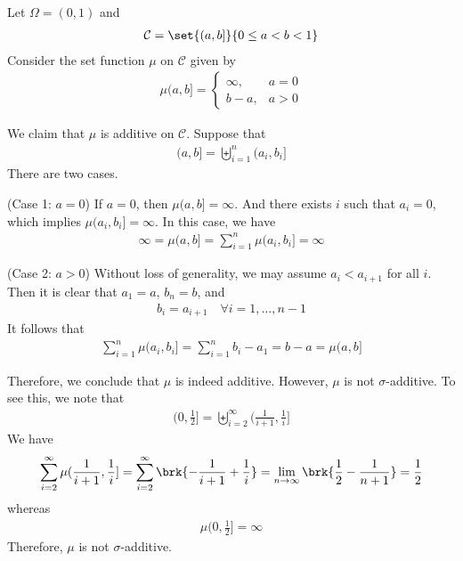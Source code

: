 \documentclass[thmcnt=section, 12pt, color=purple]{my-elegantbook}
\begin{document}
\begin{example} \label{eg:2}
	Let $\Omega = (0, 1)$ and
	\begin{align*}
		\mathcal{C} = \set{(a, b]}{0 \leq a < b < 1}
	\end{align*}
	Consider the set function $\mu$ on $\mathcal{C}$ given by
	\begin{align*}
		\mu (a, b] = \begin{cases}
			\infty,
			&a = 0 \\
			b - a,
			&a > 0
		\end{cases}
	\end{align*}
	
	We claim that $\mu$ is additive on $\mathcal{C}$.
	Suppose that
	\begin{align*}
		(a, b]
		= \biguplus_{i=1}^n (a_i, b_i]
	\end{align*}
	There are two cases.

	(Case 1: $a = 0$) If $a = 0$, then $\mu (a, b] = \infty$.
	And there exists $i$ such that $a_i = 0$,
	which implies $\mu(a_i, b_i] = \infty$.
	In this case, we have 
	\begin{align*}
		\infty = \mu (a, b]
		= \sum_{i=1}^n \mu(a_i, b_i] = \infty
	\end{align*}

	(Case 2: $a > 0$) Without loss of generality,
	we may assume $a_i < a_{i+1}$ for all $i$.
	Then it is clear that $a_1 = a$, $b_n = b$, and
	\begin{align*}
		b_i = a_{i+1}
		\quad \forall i = 1, \ldots, n-1
	\end{align*}
	It follows that 
	\begin{align*}
		\sum_{i=1}^n \mu (a_i, b_i]
		= \sum_{i=1}^n b_i - a_1
		= b - a 
		= \mu (a, b]
	\end{align*}

	Therefore, we conclude that $\mu$ is indeed additive.
	However, $\mu$ is not $\sigma$-additive.
	To see this, we note that 
	\begin{align*}
		(0, \frac{1}{2}]
		= \biguplus_{i = 2}^\infty ( \frac{1}{i+1}, \frac{1}{i} ]
	\end{align*}
	We have 
	\begin{align*}
		\sum_{i=2}^\infty \mu(\frac{1}{i+1}, \frac{1}{i}]
		= \sum_{i=2}^\infty \brk{ -\frac{1}{i+1} + \frac{1}{i}}
		= \lim_{n \to \infty} \brk{ \frac{1}{2} - \frac{1}{n+1} }
		= \frac{1}{2}
	\end{align*}
	whereas
	\begin{align*}
		\mu (0, \frac{1}{2}] = \infty
	\end{align*}
	Therefore, $\mu$ is not $\sigma$-additive.
\end{example}
\end{document}
